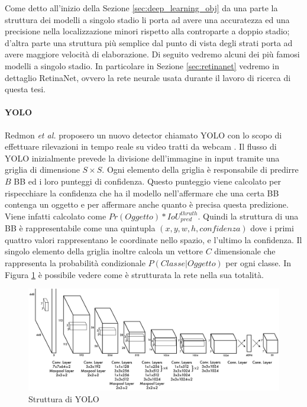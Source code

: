 Come detto all'inizio della Sezione \ref{sec:deep_learning_obj} da una parte la struttura dei modelli a singolo stadio li porta ad avere una accuratezza ed una precisione nella localizzazione minori rispetto alla controparte a doppio stadio; d'altra parte una struttura più semplice dal punto di vista degli strati porta ad avere maggiore velocità di elaborazione. Di seguito vedremo alcuni dei più famosi modelli a singolo stadio. In particolare in Sezione \ref{sec:retinanet} vedremo in dettaglio RetinaNet, ovvero la rete neurale usata durante il lavoro di ricerca di questa tesi.


\paragraph{YOLO}
Redmon \textit{et al.} proposero un nuovo detector chiamato \acf{YOLO} con lo scopo di effettuare rilevazioni in tempo reale su video tratti da webcam \cite{redmon2016you}. 
Il flusso di \ac{YOLO} inizialmente prevede la divisione dell'immagine in input tramite una griglia di dimensione $S \times S$. 
Ogni elemento della griglia è responsabile di predirre $B$ \ac{BB} ed i loro punteggi di confidenza. Questo punteggio viene calcolato per rispecchiare la confidenza che ha il modello nell'affermare che una certa \ac{BB} contenga un oggetto e per affermare anche quanto è precisa questa predizione. Viene infatti calcolato come $Pr(Oggetto) * IoU^{thruth}_{pred}$.
Quindi la struttura di una \ac{BB} è rappresentabile come una quintupla $(x, y, w, h, confidenza)$ dove i primi quattro valori rappresentano le coordinate nello spazio, e l'ultimo la confidenza. 
Il singolo elemento della griglia inoltre calcola un vettore $C$ dimensionale che rappresenta la probabilità condizionale $P(Classe | Oggetto)$ per ogni classe. In Figura \ref{fig:yolo_structure} è possibile vedere come è strutturata la rete nella sua totalità. 
\begin{figure}[]
    \centering
    \includegraphics[width=\textwidth]{images/net_yolo.pdf}
    \caption{Struttura di \ac{YOLO} \cite{redmon2016you}}
    \label{fig:yolo_structure}
\end{figure}

